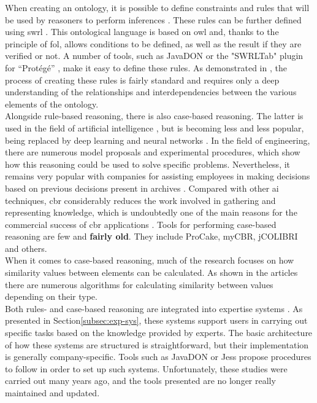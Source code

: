             When creating an ontology, it is possible to define constraints and rules that will be used by reasoners to perform inferences \cite{noy2001ontology}. These rules can be further defined using \acrfull{swrl} \cite{liu2010ontology, abadi2018improving}. This ontological language is based on \acrshort{owl} and, thanks to the principle of \acrfull{fol}, allows conditions to be defined, as well as the result if they are verified or not. A number of tools, such as JavaDON \cite{jovanovic2005achieving} or the "SWRLTab" plugin for “Protégé” \cite{liu2010ontology}, make it easy to define these rules. As demonstrated in \cite{li2018ontology, jeon2016automatic, na2016development}, the process of creating these rules is fairly standard and requires only a deep understanding of the relationships and interdependencies between the various elements of the ontology.\\

            Alongside rule-based reasoning, there is also case-based reasoning. The latter is used in the field of artificial intelligence \cite{wilke1995fallbasiertes, althoff1992fallbasiertes}, but is becoming less and less popular, being replaced by deep learning and neural networks \cite{wiratunga2011case}. In the field of engineering, there are numerous model proposals and experimental procedures, which show how this reasoning could be used to solve specific problems. Nevertheless, it remains very popular with companies for assisting employees in making decisions based on previous decisions present in archives \cite{eshach2003case}. Compared with other \acrshort{ai} techniques, \acrshort{cbr} considerably reduces the work involved in gathering and representing knowledge, which is undoubtedly one of the main reasons for the commercial success of \acrshort{cbr} applications \cite{benjamin2006using, wiratunga2011case}. Tools for performing case-based reasoning are few and \textbf{fairly old}. They include ProCake, myCBR, jCOLIBRI and others.\\

            When it comes to case-based reasoning, much of the research focuses on how similarity values between elements can be calculated. As shown in the articles \cite{shaheen2020novel, chen2012recommendation, wang2020similarity, malburg2021improving, racharak2021approximation, adel2022interval} there are numerous algorithms for calculating similarity between values depending on their type.\\

            Both rules- and case-based reasoning are integrated into expertise systems \cite{lin2021multivariable}. As presented in Section\ref{subsec:exp-sys}, these systems support users in carrying out specific tasks based on the knowledge provided by experts. The basic architecture of how these systems are structured is straightforward, but their implementation is generally company-specific. Tools such as JavaDON or Jess propose procedures to follow in order to set up such systems. Unfortunately, these studies were carried out many years ago, and the tools presented are no longer really maintained and updated.\\

